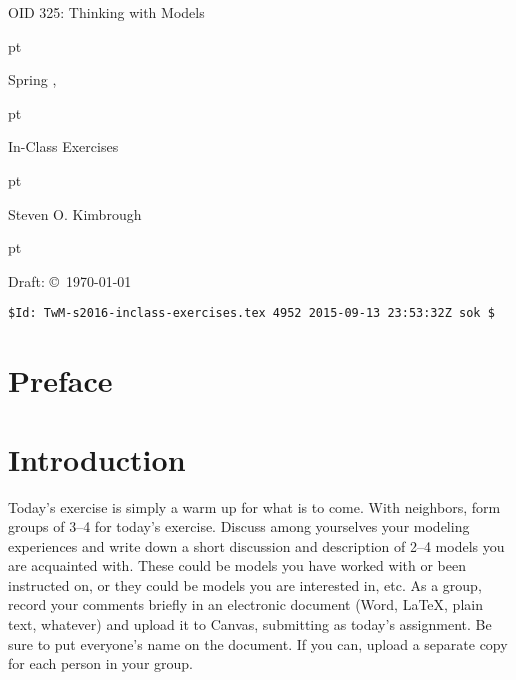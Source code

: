 \documentclass[11pt]{book}
\begin{document}

\setcounter{secnumdepth}{5}
\setcounter{tocdepth}{2}
\frontmatter
%
\pagestyle{empty}
\centerline{\Huge OID 325: Thinking with Models}
 pt
\centerline{\Large Spring \year, \place}
 pt
\centerline{\Large In-Class Exercises}
 pt
\centerline{\Large Steven O. Kimbrough}
 pt
\centerline{Draft: \copyright\ \today}

\ifnum{}
\vfill
{\footnotesize
\noindent\verb+$Id: TwM-s2016-inclass-exercises.tex 4952 2015-09-13 23:53:32Z sok $+
}
\fi


\newpage
\pagestyle{plain}
\tableofcontents

%
\listoffigures

%
\listoftables

\chapter{Preface}

\mainmatter
{}
%
\pagestyle{headings}


%
\chapter{Introduction}

Today's exercise is simply a warm up for what is to come. With neighbors, form groups of 3--4 for today's exercise. Discuss among yourselves your modeling experiences and write down a short discussion and description of 2--4 models you are acquainted with. These could be models you have worked with or been instructed on, or they could be models you are interested in, etc. As a group, record your comments briefly in an electronic document (Word, \LaTeX , plain text, whatever) and upload it to Canvas, submitting as today's assignment. Be sure to put everyone's name on the document. If you can, upload a separate copy for each person in your group.
\end{document}
